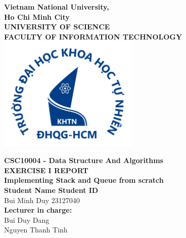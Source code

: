 \documentclass[a4paper, 12pt]{article}
\begin{document}
\begin{titlepage}
\begin{center}
\textbf{\LARGE Vietnam National University,}\\[0.5cm] 
\textbf{\LARGE Ho Chi Minh City}\\[0.5cm] 
\vspace{20pt}
\textbf{\large UNIVERSITY OF SCIENCE}\\[0.2cm]
\textbf{\large FACULTY OF INFORMATION TECHNOLOGY}\\[0.2cm]
\vspace{20pt}
\includegraphics[width=0.5\textwidth,keepaspectratio]{images/logo.png}

\par
\vspace{20pt}
\textbf{\Large CSC10004 - Data Structure And Algorithms}\\
\vspace{15pt}
\myrule[1pt][7pt]
\textbf{\LARGE EXERCISE I REPORT}\\
\vspace{15pt}
\textbf{\large Implementing Stack and Queue from scratch}\\
\vspace{10pt}
\myrule[1pt][7pt]
\vspace{25pt}
\textbf{\large Student Name \hspace{20pt} Student ID}\\
Bui Minh Duy \hspace{45pt} 23127040 \\ 

\vspace{45pt}
\textbf {\large Lecturer in charge:}\\[0.2cm]
\Large {Bui Duy Dang}\\[0.1cm]
\Large {Nguyen Thanh Tinh}\\[0.1cm]
\end{center}

\par
\vfill
\begin{center}
\\
\end{center}

\end{titlepage}
\end{document}
